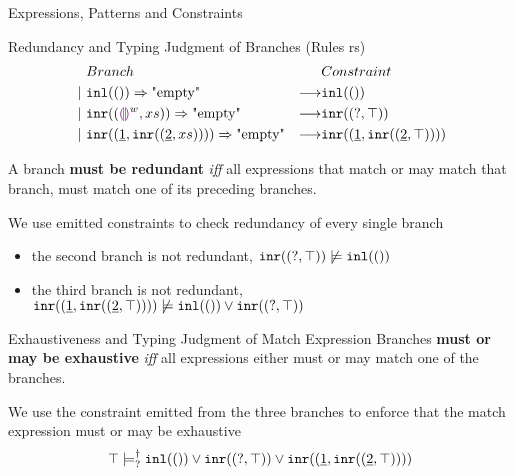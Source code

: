 \documentclass[notheorems]{beamer}
\theoremstyle{slplain}
\numberwithin{thm}{section}
\newlength{\onecolwid}
\begin{document}
\begin{frame}[containsverbatim]
\begin{columns}[t]
\begin{column}{\onecolwid}
\begin{block}{Expressions, Patterns and Constraints}
\end{block}

\begin{block}{Redundancy and Typing Judgment of Branches (Rules rs)}
  \begin{align*}
    & Branch & & Constraint \\
    ~\vert~ &
    \mathtt{inl}(()) \Rightarrow \text{"empty"} & \longrightarrow & \mathtt{inl}(()) \\
    ~\vert~ &
    \mathtt{inr}((\textcolor{violet}{\llparenthesis}\textcolor{violet}{\rrparenthesis}^{w} , xs)) \Rightarrow \text{"empty"} & \longrightarrow & \mathtt{inr}((\mathtt{?} , \top)) \\
    ~\vert~ &
    \mathtt{inr}((\underline{1} , \mathtt{inr}((\underline{2} , xs)))) \Rightarrow \text{"empty"} & \longrightarrow & \mathtt{inr}((\underline{1} , \mathtt{inr}((\underline{2} , \top))))
  \end{align*}

  A branch \textbf{must be redundant} \textit{iff} all expressions that match or may match that branch, must match one of its preceding branches.
  
  We use emitted constraints to check redundancy of every single branch
  \begin{itemize}
    \item the second branch is not redundant, $\mathtt{inr}((\mathtt{?} , \top)) \not\models \mathtt{inl}(())$
  \item the third branch is not redundant, $\mathtt{inr}((\underline{1} , \mathtt{inr}((\underline{2} , \top)))) \not\models \mathtt{inl}(()) \vee \mathtt{inr}((\mathtt{?} , \top))$
  \end{itemize}
\end{block}

\begin{block}{Exhaustiveness and Typing Judgment of Match Expression}
  Branches \textbf{must or may be exhaustive} \textit{iff} all expressions either must or may match one of the branches.

  We use the constraint emitted from the three branches to enforce that the match expression must or may be exhaustive
\[
  \csatisfyormay{\ctruth}{
    \cor{\hinlp{\cunit}}{\cor{\hinrp{\cpair{\cunknown}{\ctruth}}}{\cinr{\cpair{\cnum{1}}{\cinr{\cpair{\cnum{2}}{\ctruth}}}}}}
  }
\]
\end{block}


\end{column}
\end{columns}
\end{frame}
\end{document}
